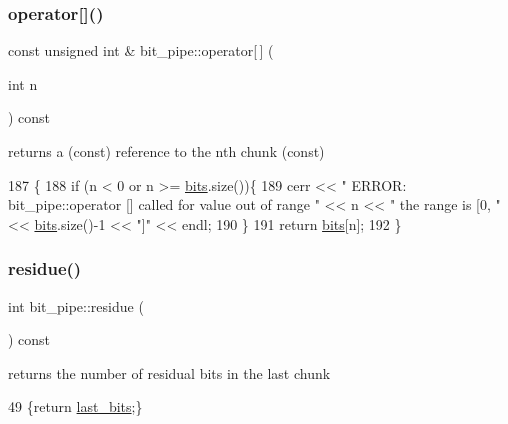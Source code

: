 \subsubsection{\texorpdfstring{operator[]()}{operator[]()}\hspace{0.1cm}{\footnotesize\ttfamily [2/2]}}
{\footnotesize\ttfamily const unsigned int \& bit\+\_\+pipe\+::operator\mbox{[}$\,$\mbox{]} (\begin{DoxyParamCaption}\item[{int}]{n }\end{DoxyParamCaption}) const}



returns a (const) reference to the nth chunk (const) 


\begin{DoxyCode}
187                                                    \{
188   \textcolor{keywordflow}{if} (n < 0 or n >= \hyperlink{classbit__pipe_a86f38af1e9736b053728033490476b50}{bits}.size())\{
189     cerr << \textcolor{stringliteral}{" ERROR: bit\_pipe::operator [] called for value out of range "} << n << \textcolor{stringliteral}{" the range is [0, "} << 
      \hyperlink{classbit__pipe_a86f38af1e9736b053728033490476b50}{bits}.size()-1 << \textcolor{stringliteral}{"]"} << endl;
190   \}
191   \textcolor{keywordflow}{return} \hyperlink{classbit__pipe_a86f38af1e9736b053728033490476b50}{bits}[n];
192 \}
\end{DoxyCode}
\mbox{\label{classbit__pipe_a283f47fa4422ac50b9b28e8f276f7252}} 
\subsubsection{\texorpdfstring{residue()}{residue()}}
{\footnotesize\ttfamily int bit\+\_\+pipe\+::residue (\begin{DoxyParamCaption}{ }\end{DoxyParamCaption}) const\hspace{0.3cm}{\ttfamily [inline]}}



returns the number of residual bits in the last chunk 


\begin{DoxyCode}
49 \{\textcolor{keywordflow}{return} \hyperlink{classbit__pipe_a0f3e84b02751803adaab499b5dad86fe}{last\_bits};\}
\end{DoxyCode}
\mbox{\label{classbit__pipe_a148fab2b6b3ee730fbaa52539d5a4d74}} 
